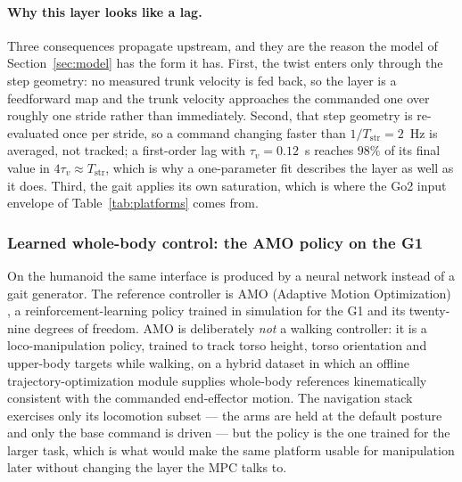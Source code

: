 \documentclass[11pt,a4paper]{article}
\newcommand{\Tstr}{T_{\mathrm{str}}}
\begin{document}
\paragraph{Why this layer looks like a lag.} Three consequences propagate upstream, and they are the reason
the model of Section~\ref{sec:model} has the form it has. First, the twist enters only through the step
geometry: no measured trunk velocity is fed back, so the layer is a feedforward map and the trunk velocity
approaches the commanded one over roughly one stride rather than immediately. Second, that step geometry is
re-evaluated once per stride, so a command changing faster than $1/\Tstr=2$~Hz is averaged, not tracked; a
first-order lag with $\tau_v=0.12$~s reaches $98\%$ of its final value in $4\tau_v\approx\Tstr$, which is why
a one-parameter fit describes the layer as well as it does. Third, the gait applies its own saturation, which
is where the Go2 input envelope of Table~\ref{tab:platforms} comes from.

\subsubsection{Learned whole-body control: the AMO policy on the G1}
\label{sec:g1rl}

On the humanoid the same interface is produced by a neural network instead of a gait generator. The reference
controller is AMO (Adaptive Motion Optimization) \cite{li2025amo}, a reinforcement-learning policy trained in
simulation for the G1 and its twenty-nine degrees of freedom. AMO is deliberately \emph{not} a walking
controller: it is a loco-manipulation policy, trained to track torso height, torso orientation and upper-body
targets while walking, on a hybrid dataset in which an offline trajectory-optimization module supplies
whole-body references kinematically consistent with the commanded end-effector motion. The navigation stack
exercises only its locomotion subset --- the arms are held at the default posture and only the base command
is driven --- but the policy is the one trained for the larger task, which is what would make the same
platform usable for manipulation later without changing the layer the MPC talks to.
\end{document}
